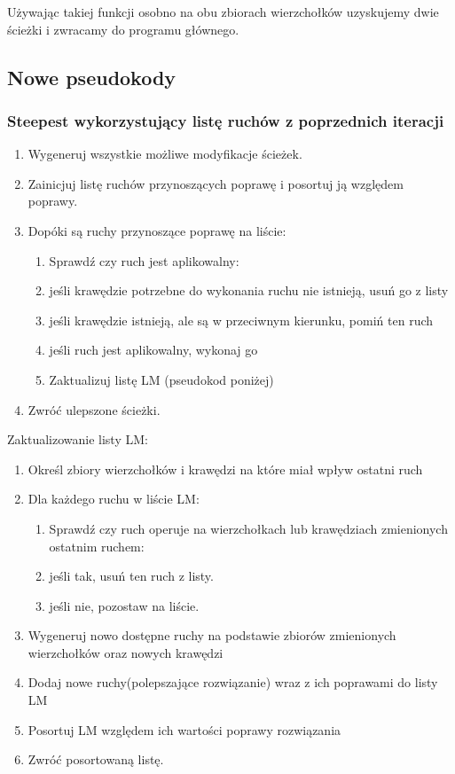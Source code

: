 \documentclass[11pt]{article}
\begin{document}
Używając takiej funkcji osobno na obu zbiorach wierzchołków uzyskujemy dwie ścieżki i zwracamy do programu głównego.

\subsection{Nowe pseudokody}\label{subsec:nowe-pseudokody}

\subsubsection{Steepest wykorzystujący listę ruchów z poprzednich iteracji}

\begin{enumerate}
  \item Wygeneruj wszystkie możliwe modyfikacje ścieżek.
  \item Zainicjuj listę ruchów przynoszących poprawę i posortuj ją względem poprawy.
  \item Dopóki są ruchy przynoszące poprawę na liście:
  \begin{enumerate}
      \item Sprawdź czy ruch jest aplikowalny:
      \item jeśli krawędzie potrzebne do wykonania ruchu nie istnieją, usuń go z listy
      \item jeśli krawędzie istnieją, ale są w przeciwnym kierunku, pomiń ten ruch
      \item jeśli ruch jest aplikowalny, wykonaj go
      \item Zaktualizuj listę LM (pseudokod poniżej)
  \end{enumerate}
  \item Zwróć ulepszone ścieżki.
\end{enumerate}


Zaktualizowanie listy LM:
\begin{enumerate}
  \item Określ zbiory wierzchołków i krawędzi na które miał wpływ ostatni ruch
  \item Dla każdego ruchu w liście LM:
  \begin{enumerate}
      \item Sprawdź czy ruch operuje na wierzchołkach lub krawędziach zmienionych ostatnim ruchem:
      \item jeśli tak, usuń ten ruch z listy.
      \item jeśli nie, pozostaw na liście.
  \end{enumerate}
  \item Wygeneruj nowo dostępne ruchy na podstawie zbiorów zmienionych wierzchołków oraz nowych krawędzi
    \item Dodaj nowe ruchy(polepszające rozwiązanie) wraz z ich poprawami do listy LM
    \item Posortuj LM względem ich wartości poprawy rozwiązania
    \item Zwróć posortowaną listę.

\end{enumerate}
\end{document}
